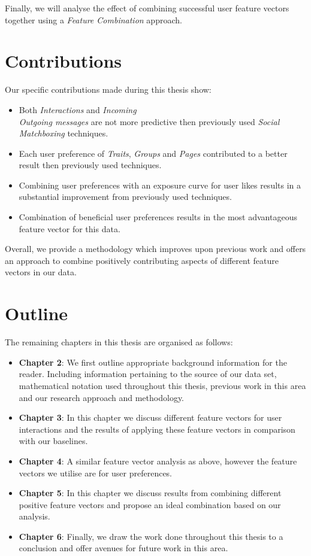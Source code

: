 Finally, we will analyse the effect of combining successful user feature vectors together using a \emph{Feature Combination} approach.

\section{Contributions}
\label{sec:contributions}

Our specific contributions made during this thesis show:

\begin{itemize}
\item Both \emph{Interactions} and \emph{Incoming\\Outgoing messages} are not more predictive then previously used \emph{Social Matchboxing} 
techniques.
\item Each user preference of \emph{Traits}, \emph{Groups} and \emph{Pages} contributed to a better result then previously used techniques.
\item Combining user preferences with an exposure curve for user likes results in a substantial improvement from previously used techniques.
\item Combination of beneficial user preferences results in the most advantageous feature vector for this data.
\end{itemize} 

Overall, we provide a methodology which improves upon previous work and offers an approach to combine positively contributing aspects of different 
feature vectors in our data.

\section{Outline}
\label{sec:outline}

The remaining chapters in this thesis are organised as follows:
\begin{itemize}
\item \textbf{Chapter 2}: We first outline appropriate background information for the reader. Including information pertaining to the source of 
our data set, mathematical notation used throughout this thesis, previous work in this area and our research approach and methodology.
\item \textbf{Chapter 3}: In this chapter we discuss different feature vectors for user interactions and the results of applying these feature vectors 
in comparison with our baselines.
\item \textbf{Chapter 4}: A similar feature vector analysis as above, however the feature vectors we utilise are for user preferences.
\item \textbf{Chapter 5}: In this chapter we discuss results from combining different positive feature vectors and propose an ideal 
combination based on our analysis.
\item \textbf{Chapter 6}: Finally, we draw the work done throughout this thesis to a conclusion and offer avenues for future work in this area.
\end{itemize}

